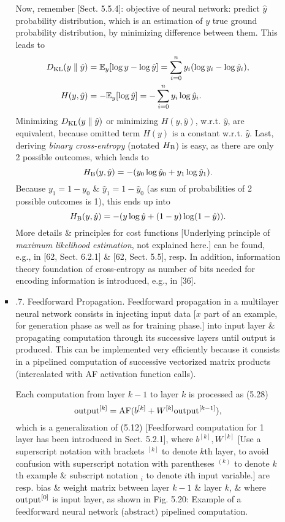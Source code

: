 \documentclass{article}
\begin{document}
\begin{itemize}
\begin{itemize}
\begin{itemize}
			Now, remember [Sect. 5.5.4]: objective of neural network: predict $\hat{y}$ probability distribution, which is an estimation of $y$ true ground probability distribution, by minimizing difference between them. This leads to
			\begin{align*}
				D_{\rm KL}(y\parallel\hat{y}) &= \mathbb{E}_y[\log y - \log\hat{y}] = \sum_{i=0}^n y_i(\log y_i - \log\hat{y}_i),\\
				H(y,\hat{y}) &= -\mathbb{E}_y[\log\hat{y}] = -\sum_{i=0}^n y_i\log\hat{y}_i.
			\end{align*}
			Minimizing $D_{\rm KL}(y\parallel\hat{y})$ or minimizing $H(y,\hat{y})$, w.r.t. $\hat{y}$, are equivalent, because omitted term $H(y)$ is a constant w.r.t. $\hat{y}$. Last, deriving {\it binary cross-entropy} (notated $H_{\rm B}$) is easy, as there are only 2 possible outcomes, which leads to
			\begin{equation*}
				H_{\rm B}(y,\hat{y}) = -(y_0\log\hat{y}_0 + y_1\log\hat{y}_1).
			\end{equation*}
			Because $y_1 = 1 - y_0$ \& $\hat{y}_1 = 1 - \hat{y}_0$ (as sum of probabilities of 2 possible outcomes is 1), this ends up into
			\begin{equation*}
				H_{\rm B}(y,\hat{y}) = -(y\log\hat{y} + (1 - y)\log(1 - \hat{y})).
			\end{equation*}
			More details \& principles for cost functions [Underlying principle of {\it maximum likelihood estimation}, not explained here.] can be found, e.g., in [62, Sect. 6.2.1] \& [62, Sect. 5.5], resp. In addition, information theory foundation of cross-entropy as number of bits needed for encoding information is introduced, e.g., in [36].
			\item {.7. Feedforward Propagation.} Feedforward propagation in a multilayer neural network consists in injecting input data [$x$ part of an example, for generation phase as well as for training phase.] into input layer \& propagating computation through its successive layers until output is produced. This can be implemented very efficiently because it consists in a pipelined computation of successive vectorized matrix products (intercalated with AF activation function calls).

			Each computation from layer $k - 1$ to layer $k$ is processed as (5.28)
			\begin{equation*}
				{\rm output}^{[k]} = {\rm AF}(b^{[k]} + W^{[k]}{\rm output}^{[k-1]}),
			\end{equation*}
			which is a generalization of (5.12) [Feedforward computation for 1 layer has been introduced in Sect. 5.2.1], where $b^{[k]},W^{[k]}$ [Use a superscript notation with brackets ${}^{[k]}$ to denote $k$th layer, to avoid confusion with superscript notation with parentheses ${}^{(k)}$ to denote $k$th example \& subscript notation ${}_i$ to denote $i$th input variable.] are resp. bias \& weight matrix between layer $k - 1$ \& layer $k$, \& where ${\rm output}^{[0]}$ is input layer, as shown in {\sf Fig. 5.20: Example of a feedforward neural network (abstract) pipelined computation.}


\end{itemize}
\end{itemize}
\end{itemize}
\end{document}
